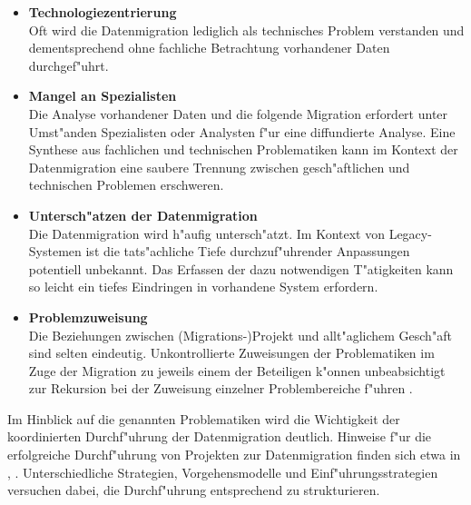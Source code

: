 \begin{itemize}
	\item \textbf{Technologiezentrierung} \\
			Oft wird die Datenmigration lediglich als technisches Problem verstanden \citep[S.~9]{morris-2012} und dementsprechend ohne fachliche Betrachtung vorhandener Daten durchgef"uhrt.
	\item \textbf{Mangel an Spezialisten} \\
			Die Analyse vorhandener Daten und die folgende Migration erfordert unter Umst"anden Spezialisten oder Analysten f"ur eine diffundierte Analyse. Eine Synthese aus fachlichen und technischen Problematiken kann im Kontext der Datenmigration eine saubere Trennung zwischen gesch"aftlichen und technischen Problemen erschweren.
	\item \textbf{Untersch"atzen der Datenmigration} \\
			Die Datenmigration wird h"aufig untersch"atzt. Im Kontext von Legacy-Systemen ist die tats"achliche Tiefe durchzuf"uhrender Anpassungen potentiell unbekannt. Das Erfassen der dazu notwendigen T"atigkeiten kann so leicht ein tiefes Eindringen in vorhandene System erfordern.
	\item \textbf{Problemzuweisung} \\
			Die Beziehungen zwischen (Migrations-)Projekt und allt"aglichem Gesch"aft sind selten eindeutig. Unkontrollierte Zuweisungen der Problematiken im Zuge der Migration zu jeweils einem der Beteiligen k"onnen unbeabsichtigt zur Rekursion bei der Zuweisung einzelner Problembereiche f"uhren \citep[S.~9]{morris-2012}.
\end{itemize}

Im Hinblick auf die genannten Problematiken wird die Wichtigkeit der koordinierten Durchf"uhrung der Datenmigration deutlich. Hinweise f"ur die erfolgreiche Durchf"uhrung von Projekten zur Datenmigration finden sich etwa in \citep{sas-2009}, \citep{oracle-2011}. Unterschiedliche Strategien, Vorgehensmodelle und Einf"uhrungsstrategien versuchen dabei, die Durchf"uhrung entsprechend zu strukturieren. 